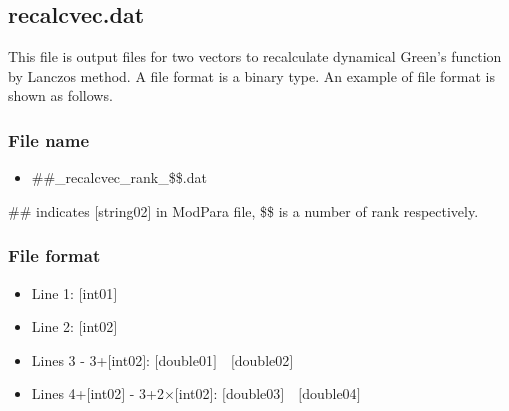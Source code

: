 \newpage
\subsection{{recalcvec.dat}}
This file is output files for two vectors to recalculate dynamical Green's function by Lanczos method. 
A file format is a binary type. 
An example of file format is shown as follows.

\subsubsection{File name}
\begin{itemize}
   \item{\#\#\_recalcvec\_rank\_\$\$.dat}
\end{itemize}
\#\# indicates [string02] in ModPara file, \$\$ is a number of rank respectively. 

\subsubsection{File format}
 \begin{itemize}
   \item  Line 1: $[$int01$]$
   \item  Line 2: $[$int02$]$
   \item  Lines 3 - 3+$[$int02$]$: $[$double01$]$~~$[$double02$]$
   \item  Lines 4+$[$int02$]$ - 3+2$\times [$int02$]$: $[$double03$]$~~$[$double04$]$

  \end{itemize}
